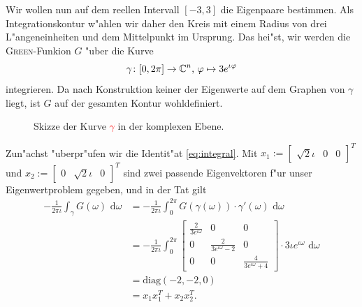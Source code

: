 Wir wollen nun auf dem reellen Intervall $[-3,3]$ die Eigenpaare bestimmen.
Als Integrationskontur w"ahlen wir daher den Kreis mit einem Radius von drei
L"angeneinheiten und dem Mittelpunkt im Ursprung. Das hei"st, wir werden die
\textsc{Green}-Funkion $G$ "uber die Kurve
\begin{equation}\label{kurve}
\gamma\colon [0,2\pi]\to\mathbb{C}^n\text{, }\varphi\mapsto 3e^{\iota \varphi}
\end{equation}
integrieren. Da nach Konstruktion keiner der Eigenwerte auf dem
Graphen von $\gamma$ liegt, ist $G$ auf der gesamten Kontur wohldefiniert.

\begin{figure}[h!]
	\center
	\caption{Skizze der Kurve \textcolor{red}{$\gamma$} in der komplexen Ebene.}
\end{figure}

Zun"achst "uberpr"ufen wir
die Identit"at \eqref{eq:integral}. Mit $x_1 := \begin{bmatrix} \sqrt2 \iota & 0 & 0
\end{bmatrix}^T$
und $x_2 := \begin{bmatrix} 0 & \sqrt2 \iota &0\end{bmatrix}^T$ sind zwei passende
Eigenvektoren f"ur unser Eigenwertproblem gegeben, und in der Tat gilt
\begin{align*}
-\frac{1}{2\pi\iota} \int_\gamma G(\omega) \text{ d}\omega &=
-\frac{1}{2\pi\iota}\int_0^{2\pi} G(\gamma(\omega))\cdot \gamma'(\omega)
\text{ d}\omega \\
&= -\frac{1}{2\pi\iota}\int_0^{2\pi} \begin{bmatrix} \frac{2}{3e^{\iota\omega}}&0&0\\
0 & \frac{2}{3e^{\iota\omega}-2}&0\\
0&0&\frac{4}{3e^{\iota\omega}+4}
 \end{bmatrix}\cdot 3\iota e^{\iota\omega}
\text{ d}\omega \\
&= \text{diag}(-2,-2,0) \\
&= x_1 x_1^{T} + x_2 x_2^T.
\end{align*}

